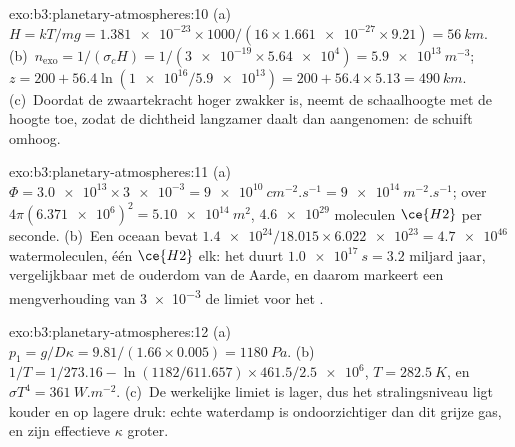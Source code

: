 \begin{solution}{exo:b3:planetary-atmospheres:10}
(a)~$H = kT/mg = \num{1.381e-23}\times1000/(16\times\num{1.661e-27}\times9.21)
= \qty{56}{km}$. (b)~$n_\mathrm{exo} = 1/(\sigma_c H) = 1/(\num{3e-19}\times
\num{5.64e4}) = \qty{5.9e13}{m^{-3}}$; $z = 200 + 56.4\ln(\num{1e16}/
\num{5.9e13}) = 200 + 56.4\times5.13 = \qty{490}{km}$. (c)~Doordat de zwaartekracht hoger zwakker is,
neemt de schaalhoogte met de hoogte toe, zodat de dichtheid langzamer daalt
dan aangenomen: de  schuift omhoog.
\end{solution}

\begin{solution}{exo:b3:planetary-atmospheres:11}
(a)~$\Phi = \num{3.0e13}\times\num{3e-3} = \qty{9e10}{cm^{-2}.s^{-1}} =
\qty{9e14}{m^{-2}.s^{-1}}$; over $4\pi(\num{6.371e6})^2 =
\qty{5.10e14}{m^2}$, $\num{4.6e29}$ moleculen $\ce{H2}$ per seconde.
(b)~Een oceaan bevat $\num{1.4e24}/18.015\times\num{6.022e23} =
\num{4.7e46}$ watermoleculen, één $\ce{H2}$ elk: het duurt
$\qty{1.0e17}{s} = \num{3.2}\text{ miljard jaar}$, vergelijkbaar met de ouderdom van
de Aarde, en daarom markeert een mengverhouding van \num{3e-3} de limiet voor het .
\end{solution}

\begin{solution}{exo:b3:planetary-atmospheres:12}
(a)~$p_1 = g/D\kappa = 9.81/(1.66\times0.005) = \qty{1180}{Pa}$.
(b)~$1/T = 1/273.16 - \ln(1182/611.657)\times461.5/\num{2.5e6}$, $T =
\qty{282.5}{K}$, en $\sigma T^4 = \qty{361}{W.m^{-2}}$. (c)~De werkelijke limiet
is lager, dus het stralingsniveau ligt kouder en op lagere druk: echte
waterdamp is ondoorzichtiger dan dit grijze gas, en zijn effectieve $\kappa$
groter.
\end{solution}

